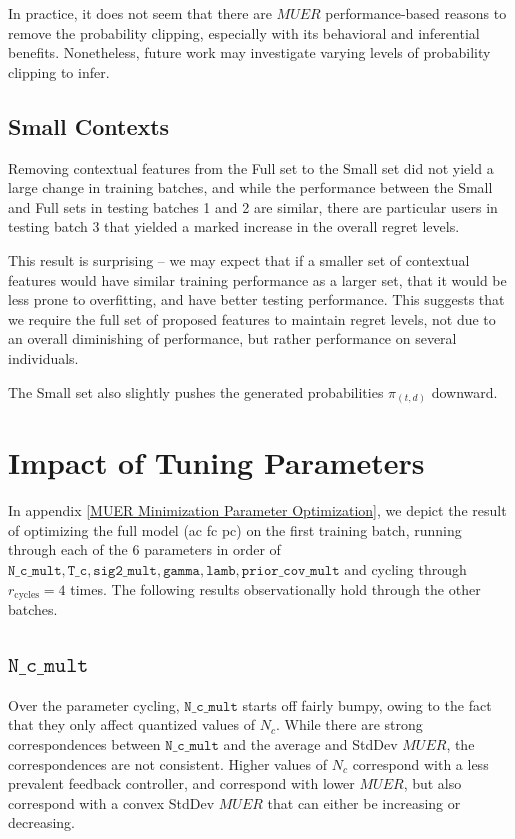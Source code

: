 In practice, it does not seem that there are $MUER$ performance-based reasons to remove the probability clipping, especially with its behavioral and inferential benefits.  Nonetheless, future work may investigate varying levels of probability clipping to infer.

\subsection{Small Contexts}

Removing contextual features from the Full set to the Small set did not yield a large change in training batches, and while the performance between the Small and Full sets in testing batches 1 and 2 are similar, there are particular users in testing batch 3 that yielded a marked increase in the overall regret levels.

This result is surprising -- we may expect that if a smaller set of contextual features would have similar training performance as a larger set, that it would be less prone to overfitting, and have better testing performance.  This suggests that we require the full set of proposed features to maintain regret levels, not due to an overall diminishing of performance, but rather performance on several individuals.

The Small set also slightly pushes the generated probabilities $\pi_{(t,d)}$ downward.



\section{Impact of Tuning Parameters}

In appendix \ref{MUER Minimization Parameter Optimization}, we depict the result of optimizing the full model (ac fc pc) on the first training batch, running through each of the $6$ parameters in order of \\
\noindent $\mathtt{N\_c\_mult},\mathtt{T\_c},\mathtt{sig2\_mult},\mathtt{gamma},\mathtt{lamb},\mathtt{prior\_cov\_mult}$ and cycling through $r_{\text{cycles}} = 4$ times.  The following results observationally hold through the other batches.  



\subsection{$\mathtt{N\_c\_mult}$}

Over the parameter cycling, $\mathtt{N\_c\_mult}$ starts off fairly bumpy, owing to the fact that they only affect quantized values of $N_c$.  While there are strong correspondences between $\mathtt{N\_c\_mult}$ and the average and StdDev $MUER$, the correspondences are not consistent. Higher values of $N_c$ correspond with a less prevalent feedback controller, and correspond with lower $MUER$, but also correspond with a convex StdDev $MUER$ that can either be increasing or decreasing.

